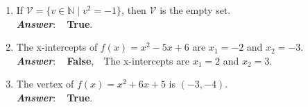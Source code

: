 \documentclass[12pt]{article} %
\begin{document}
\begin{qstn}
\begin{enumerate}
    \item If $\mathcal{V} = \{v \in \mathbb N \mid v^2 = -1\}$, then $\mathcal{V}$ is the empty set.\\
      \textbf{\emph{Answer}}: \,\,\, \textbf{True}. \,\,\\

    \item The x-intercepts of $f(x) = x^2 -5x + 6$ are $x_1 = -2$ and $x_2 = -3$.\\
      \textbf{\emph{Answer}}: \,\,\, \textbf{False}, \,\, The x-intercepts are $x_1 = 2$ and $x_2 = 3$.\\

    \item The vertex of $f(x) = x^2 + 6x + 5$ is $(-3,-4)$. \\
      \textbf{\emph{Answer}}: \,\,\, \textbf{True}. \,\,\\

  \end{enumerate}
\end{qstn}

\newpage
\end{document}
